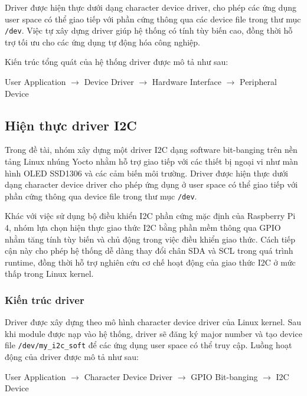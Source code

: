 Driver được hiện thực dưới dạng character device driver, cho phép các ứng dụng user space có thể giao tiếp với phần cứng thông qua các device file trong thư mục \texttt{/dev}. Việc tự xây dựng driver giúp hệ thống có tính tùy biến cao, đồng thời hỗ trợ tối ưu cho các ứng dụng tự động hóa công nghiệp.

Kiến trúc tổng quát của hệ thống driver được mô tả như sau:

\begin{center}
User Application $\rightarrow$ Device Driver $\rightarrow$ Hardware Interface $\rightarrow$ Peripheral Device
\end{center}


\subsection{Hiện thực driver I2C}

Trong đề tài, nhóm xây dựng một driver I2C dạng software bit-banging trên nền tảng Linux nhúng Yocto nhằm hỗ trợ giao tiếp với các thiết bị ngoại vi như màn hình OLED SSD1306 và các cảm biến môi trường. Driver được hiện thực dưới dạng character device driver cho phép ứng dụng ở user space có thể giao tiếp với phần cứng thông qua device file trong thư mục \texttt{/dev}.

Khác với việc sử dụng bộ điều khiển I2C phần cứng mặc định của Raspberry Pi 4, nhóm lựa chọn hiện thực giao thức I2C bằng phần mềm thông qua GPIO nhằm tăng tính tùy biến và chủ động trong việc điều khiển giao thức. Cách tiếp cận này cho phép hệ thống dễ dàng thay đổi chân SDA và SCL trong quá trình runtime, đồng thời hỗ trợ nghiên cứu cơ chế hoạt động của giao thức I2C ở mức thấp trong Linux kernel.

\subsubsection{Kiến trúc driver}

Driver được xây dựng theo mô hình character device driver của Linux kernel. Sau khi module được nạp vào hệ thống, driver sẽ đăng ký major number và tạo device file \texttt{/dev/my\_i2c\_soft} để các ứng dụng user space có thể truy cập.
Luồng hoạt động của driver được mô tả như sau:

\begin{center}
User Application $\rightarrow$ Character Device Driver $\rightarrow$ GPIO Bit-banging $\rightarrow$ I2C Device
\end{center}

